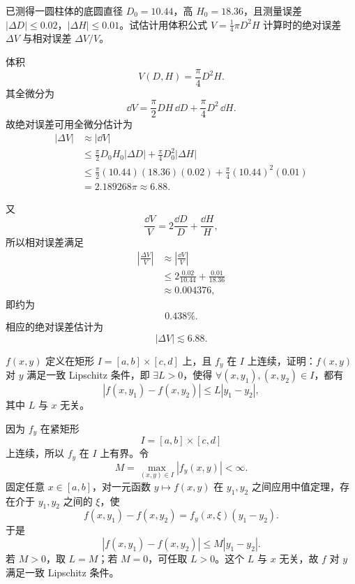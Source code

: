 \begin{xexercise}[5]
已测得一圆柱体的底圆直径 $D_0=10.44$，高 $H_0=18.36$，且测量误差 $|\Delta D|\le0.02$，$|\Delta H|\le0.01$。试估计用体积公式 $V=\frac14\pi D^2H$ 计算时的绝对误差 $\Delta V$ 与相对误差 $\Delta V/V$。
\end{xexercise}
\begin{xsolution}
体积
\[
  V(D,H)=\frac\pi4D^2H.
\]
其全微分为
\[
  \dd V=\frac\pi2DH\,\dd D+\frac\pi4D^2\,\dd H.
\]
故绝对误差可用全微分估计为
\begin{align*}
  |\Delta V|
  &\approx |\dd V|\\
  &\le \frac\pi2D_0H_0|\Delta D|
       +\frac\pi4D_0^2|\Delta H|\\
  &\le \frac\pi2(10.44)(18.36)(0.02)
       +\frac\pi4(10.44)^2(0.01)\\
  &=2.189268\pi\approx6.88.
\end{align*}

又
\[
  \frac{\dd V}{V}=2\frac{\dd D}{D}+\frac{\dd H}{H},
\]
所以相对误差满足
\begin{align*}
  \left|\frac{\Delta V}{V}\right|
  &\approx\left|\frac{\dd V}{V}\right|\\
  &\le2\frac{0.02}{10.44}+\frac{0.01}{18.36}\\
  &\approx0.004376,
\end{align*}
即约为
\[
  \boxed{0.438\%}.
\]
相应的绝对误差估计为
\[
  \boxed{|\Delta V|\lesssim6.88}.
\]
\end{xsolution}


\begin{xexercise}[6]
$f(x,y)$ 定义在矩形 $I=[a,b]\times[c,d]$ 上，且 $f_y$ 在 $I$ 上连续，证明：$f(x,y)$ 对 $y$ 满足一致 Lipschitz 条件，即 $\exists L>0$，使得 $\forall(x,y_1),(x,y_2)\in I$，都有
  \[
    |f(x,y_1)-f(x,y_2)|\le L|y_1-y_2|,
  \]
  其中 $L$ 与 $x$ 无关。
\end{xexercise}
\begin{xsolution}
因为 $f_y$ 在紧矩形
\[
  I=[a,b]\times[c,d]
\]
上连续，所以 $f_y$ 在 $I$ 上有界。令
\[
  M=\max_{(x,y)\in I}|f_y(x,y)|<\infty.
\]
固定任意 $x\in[a,b]$，对一元函数 $y\mapsto f(x,y)$ 在 $y_1,y_2$ 之间应用中值定理，存在介于 $y_1,y_2$ 之间的 $\xi$，使
\[
  f(x,y_1)-f(x,y_2)=f_y(x,\xi)(y_1-y_2).
\]
于是
\[
  |f(x,y_1)-f(x,y_2)|
  \le M|y_1-y_2|.
\]
若 $M>0$，取 $L=M$；若 $M=0$，可任取 $L>0$。这个 $L$ 与 $x$ 无关，故 $f$ 对 $y$ 满足一致 Lipschitz 条件。
\end{xsolution}


